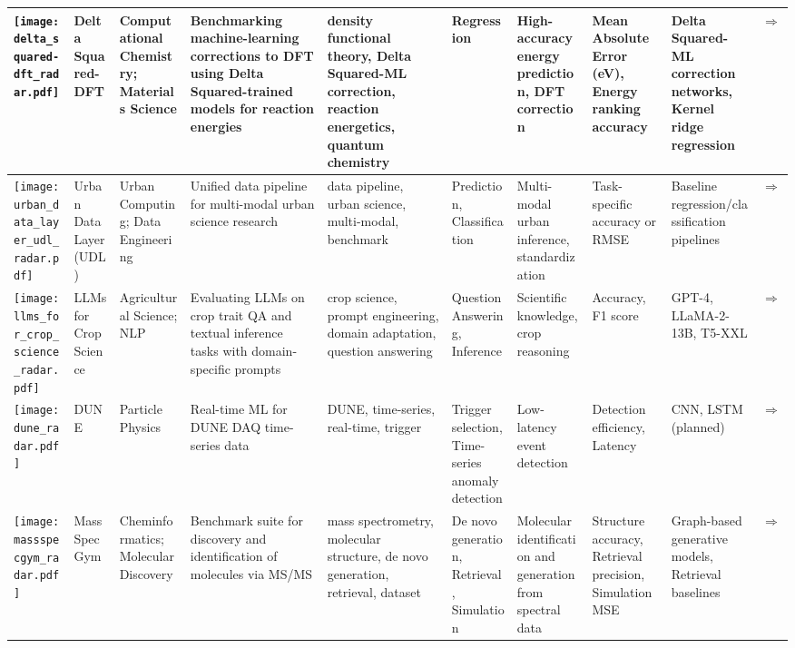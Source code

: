 \begin{landscape}
{\begin{longtable}{|p{}|p{}|p{}|p{}|p{}|p{}|p{}|p{}|p{}|p{}|}
\texttt{[image: delta\_squared-dft\_radar.pdf]} & Delta Squared-DFT & Computational Chemistry; Materials Science & Benchmarking machine-learning corrections to DFT using Delta Squared-trained models for reaction energies & density functional theory, Delta Squared-ML correction, reaction energetics, quantum chemistry & Regression & High-accuracy energy prediction, DFT correction & Mean Absolute Error (eV), Energy ranking accuracy & Delta Squared-ML correction networks, Kernel ridge regression & \cite{khrabrov2024nabla2dftuniversalquantumchemistry}\href{https://neurips.cc/virtual/2024/poster/97788}{$\Rightarrow$} \\ \hline
\texttt{[image: urban\_data\_layer\_udl\_radar.pdf]} & Urban Data Layer (UDL) & Urban Computing; Data Engineering & Unified data pipeline for multi-modal urban science research & data pipeline, urban science, multi-modal, benchmark & Prediction, Classification & Multi-modal urban inference, standardization & Task-specific accuracy or RMSE & Baseline regression/classification pipelines & \cite{neurips2024_0db7f135}\href{https://neurips.cc/virtual/2024/poster/97837}{$\Rightarrow$} \\ \hline
\texttt{[image: llms\_for\_crop\_science\_radar.pdf]} & LLMs for Crop Science & Agricultural Science; NLP & Evaluating LLMs on crop trait QA and textual inference tasks with domain-specific prompts & crop science, prompt engineering, domain adaptation, question answering & Question Answering, Inference & Scientific knowledge, crop reasoning & Accuracy, F1 score & GPT-4, LLaMA-2-13B, T5-XXL & \cite{shen2024exploringuserretrievalintegration}\href{https://neurips.cc/virtual/2024/poster/97570}{$\Rightarrow$} \\ \hline
\texttt{[image: dune\_radar.pdf]} & DUNE & Particle Physics & Real-time ML for DUNE DAQ time-series data & DUNE, time-series, real-time, trigger & Trigger selection, Time-series anomaly detection & Low-latency event detection & Detection efficiency, Latency & CNN, LSTM (planned) & \cite{abud2021deep}\href{https://indico.fnal.gov/event/66520/contributions/301423/attachments/182439/250508/fast\_ml\_dunedaq\_sonic\_10\_15\_24.pdf}{$\Rightarrow$} \\ \hline
\texttt{[image: massspecgym\_radar.pdf]} & MassSpecGym & Cheminformatics; Molecular Discovery & Benchmark suite for discovery and identification of molecules via MS/MS & mass spectrometry, molecular structure, de novo generation, retrieval, dataset & De novo generation, Retrieval, Simulation & Molecular identification and generation from spectral data & Structure accuracy, Retrieval precision, Simulation MSE & Graph-based generative models, Retrieval baselines & \cite{neurips2024_c6c31413}\href{https://neurips.cc/virtual/2024/poster/97823}{$\Rightarrow$} \\ \hline

\end{longtable}}
\end{landscape}
